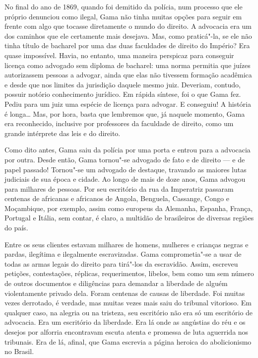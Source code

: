 No final do ano de 1869, quando foi demitido da polícia, num processo
que ele próprio denunciou como ilegal, Gama não tinha muitas opções para
seguir em frente com algo que tocasse diretamente o mundo do direito. A
advocacia era um dos caminhos que ele certamente mais desejava. Mas,
como praticá"-la, se ele não tinha título de bacharel por uma das duas
faculdades de direito do Império? Era quase impossível. Havia, no
entanto, uma maneira perspicaz para conseguir licença como advogado sem
diploma de bacharel: uma norma permitia que juízes autorizassem pessoas
a advogar, ainda que elas não tivessem formação acadêmica e desde que
nos limites da jurisdição daquele mesmo juiz. Deveriam, contudo, possuir
notório conhecimento jurídico. Em rápida síntese, foi o que Gama fez.
Pediu para um juiz uma espécie de licença para advogar. E conseguiu! A
história é longa\ldots{} Mas, por hora, basta que lembremos que, já naquele
momento, Gama era reconhecido, inclusive por professores da faculdade de
direito, como um grande intérprete das leis e do direito.

Como dito antes, Gama saiu da polícia por uma porta e entrou para a
advocacia por outra. Desde então, Gama tornou"-se advogado de fato e de
direito --- e de papel passado! Tornou"-se um advogado de destaque,
travando as maiores lutas judiciais de sua época e cidade. Ao longo de
mais de doze anos, Gama advogou para milhares de pessoas. Por seu
escritório da rua da Imperatriz passaram centenas de africanas e
africanos de Angola, Benguela, Cassange, Congo e Moçambique, por
exemplo, assim como europeus da Alemanha, Espanha, França, Portugal e
Itália, sem contar, é claro, a multidão de brasileiros de diversas
regiões do país.

Entre os seus clientes estavam milhares de homens, mulheres e crianças
negras e pardas, ilegítima e ilegalmente escravizadas. Gama
comprometia"-se a usar de todas as armas legais do direito para tirá"-los
da escravidão. Assim, escreveu petições, contestações, réplicas,
requerimentos, libelos, bem como um sem número de outros documentos e
diligências para demandar a liberdade de alguém violentamente privado
dela. Foram centenas de causas de liberdade. Foi muitas vezes derrotado,
é verdade, mas muitas vezes mais saiu do tribunal vitorioso. Em qualquer
caso, na alegria ou na tristeza, seu escritório não era só um escritório
de advocacia. Era um escritório da liberdade. Era lá onde as angústias
do réu e os desejos por alforria encontravam escuta atenta e promessa de
luta aguerrida nos tribunais. Era de lá, afinal, que Gama escrevia a
página heroica do abolicionismo no Brasil.


